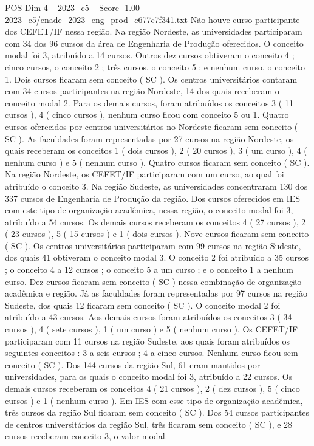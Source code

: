 \begin{textsample}{POS Dim 4 – 2023\_c5 – Score -1.00 – 2023\_c5/enade\_2023\_eng\_prod\_c677c7f341.txt}
Não houve curso participante dos CEFET/IF nessa região.
Na região Nordeste, as universidades participaram com 34 dos 96 cursos da área de Engenharia de Produção oferecidos.
O conceito modal foi 3, atribuído a 14 cursos.
Outros dez cursos obtiveram o conceito 4 ; cinco cursos, o conceito 2 ; três cursos, o conceito 5 ; e nenhum curso, o conceito 1.
Dois cursos ficaram sem conceito ( SC ).
Os centros universitários contaram com 34 cursos participantes na região Nordeste, 14 dos quais receberam o conceito modal 2.
Para os demais cursos, foram atribuídos os conceitos 3 ( 11 cursos ), 4 ( cinco cursos ), nenhum curso ficou com conceito 5 ou 1.
Quatro cursos oferecidos por centros universitários no Nordeste ficaram sem conceito ( SC ).
As faculdades foram representadas por 27 cursos na região Nordeste, os quais receberam os conceitos 1 ( dois cursos ), 2 ( 20 cursos ), 3 ( um curso ), 4 ( nenhum curso ) e 5 ( nenhum curso ).
Quatro cursos ficaram sem conceito ( SC ).
Na região Nordeste, os CEFET/IF participaram com um curso, ao qual foi atribuído o conceito 3.
Na região Sudeste, as universidades concentraram 130 dos 337 cursos de Engenharia de Produção da região.
Dos cursos oferecidos em IES com este tipo de organização acadêmica, nessa região, o conceito modal foi 3, atribuído a 54 cursos.
Os demais cursos receberam os conceitos 4 ( 27 cursos ), 2 ( 23 cursos ), 5 ( 15 cursos ) e 1 ( dois cursos ).
Nove cursos ficaram sem conceito ( SC ).
Os centros universitários participaram com 99 cursos na região Sudeste, dos quais 41 obtiveram o conceito modal 3.
O conceito 2 foi atribuído a 35 cursos ; o conceito 4 a 12 cursos ; o conceito 5 a um curso ; e o conceito 1 a nenhum curso.
Dez cursos ficaram sem conceito ( SC ) nessa combinação de organização acadêmica e região.
Já as faculdades foram representadas por 97 cursos na região Sudeste, dos quais 12 ficaram sem conceito ( SC ).
O conceito modal 2 foi atribuído a 43 cursos.
Aos demais cursos foram atribuídos os conceitos 3 ( 34 cursos ), 4 ( sete cursos ), 1 ( um curso ) e 5 ( nenhum curso ).
Os CEFET/IF participaram com 11 cursos na região Sudeste, aos quais foram atribuídos os seguintes conceitos : 3 a seis cursos ; 4 a cinco cursos.
Nenhum curso ficou sem conceito ( SC ).
Dos 144 cursos da região Sul, 61 eram mantidos por universidades, para os quais o conceito modal foi 3, atribuído a 22 cursos.
Os demais cursos receberam os conceitos 4 ( 21 cursos ), 2 ( dez cursos ), 5 ( cinco cursos ) e 1 ( nenhum curso ).
Em IES com esse tipo de organização acadêmica, três cursos da região Sul ficaram sem conceito ( SC ).
Dos 54 cursos participantes de centros universitários da região Sul, três ficaram sem conceito ( SC ), e 28 cursos receberam conceito 3, o valor modal.

\end{textsample}
